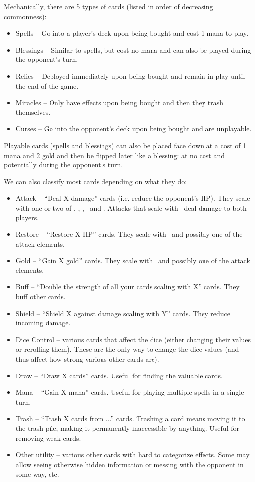 \documentclass[dvipsnames,parskip,a4paper]{scrartcl}
\newcommand{\iconsize}{3.4mm}
\newcommand{\icondepth}{0.45mm}
\newcommand{\icon}[1]{\raisebox{-\icondepth}{\texttt{[image:  \#1 ]}}}
\newcommand{\chance}{\icon{icons/chance.png}}
\newcommand{\fire}{\icon{icons/fire.png}}
\newcommand{\earth}{\icon{icons/earth.png}}
\newcommand{\water}{\icon{icons/water.png}}
\newcommand{\nature}{\icon{icons/nature.png}}
\newcommand{\magic}{\icon{icons/magic.png}}
\newcommand{\gold}{\icon{icons/gold.png}}
\begin{document}
Mechanically, there are 5 types of cards (listed in order of decreasing commonness):

\begin{itemize}
\item Spells -- Go into a player's deck upon being bought and cost 1 mana to play.
\item Blessings -- Similar to spells, but cost no mana and can also be played during the opponent's turn.
\item Relics -- Deployed immediately upon being bought and remain in play until the end of the game.
\item Miracles -- Only have effects upon being bought and then they trash themselves.
\item Curses -- Go into the opponent's deck upon being bought and are unplayable.
\end{itemize}

Playable cards (spells and blessings) can also be placed face down at a cost of 1 mana and 2 gold and then be flipped later like a blessing: at no cost and potentially during the opponent's turn.

\vspace{4pt}

We can also classify most cards depending on what they do:

\begin{itemize}
\item Attack -- ``Deal X damage'' cards (i.e. reduce the opponent's HP). They scale with one or two of \chance, \fire, \earth, \water \ and \magic. Attacks that scale with \water \ deal damage to both players.
\item Restore -- ``Restore X HP'' cards. They scale with \nature \ and possibly one of the attack elements.
\item Gold -- ``Gain X gold'' cards. They scale with \gold \ and possibly one of the attack elements.
\item Buff -- ``Double the strength of all your cards scaling with X'' cards. They buff other cards.
\item Shield -- ``Shield X against damage scaling with Y'' cards. They reduce incoming damage.
\item Dice Control -- various cards that affect the dice (either changing their values or rerolling them). These are the only way to change the dice values (and thus affect how strong various other cards are).
\item Draw -- ``Draw X cards'' cards. Useful for finding the valuable cards.
\item Mana -- ``Gain X mana'' cards. Useful for playing multiple spells in a single turn.
\item Trash -- ``Trash X cards from ...'' cards. Trashing a card means moving it to the trash pile, making it permanently inaccessible by anything. Useful for removing weak cards.
\item Other utility -- various other cards with hard to categorize effects. Some may allow seeing otherwise hidden information or messing with the opponent in some way, etc.
\end{itemize}
\end{document}
